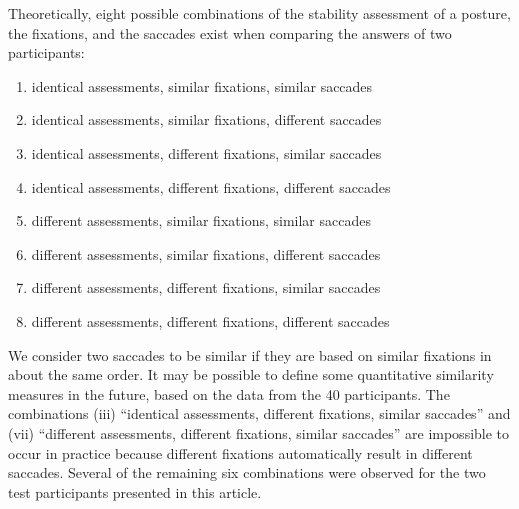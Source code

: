 \documentclass[11pt]{asaproc}
\begin{document}
Theoretically, eight possible combinations of the stability assessment of a posture, the fixations, and the saccades exist
when comparing the answers of two participants:
\begin{enumerate}
\item identical assessments, similar fixations, similar saccades
\item identical assessments, similar fixations, different saccades
\item identical assessments, different fixations, similar saccades
\item identical assessments, different fixations, different saccades
\item different assessments, similar fixations, similar saccades
\item different assessments, similar fixations, different saccades
\item different assessments, different fixations, similar saccades
\item different assessments, different fixations, different saccades
\end{enumerate}
We consider two saccades to be similar if they are based on similar fixations in
about the same order. It may be possible to define some quantitative similarity measures in the future,
based on the data from the 40 participants.
The combinations (iii) ``identical assessments, different fixations, similar saccades''
and (vii) ``different assessments, different fixations, similar saccades'' are impossible
to occur in practice because different fixations automatically result in different saccades.
Several of the remaining six combinations were observed for the two test participants presented 
in this article.
\end{document}
